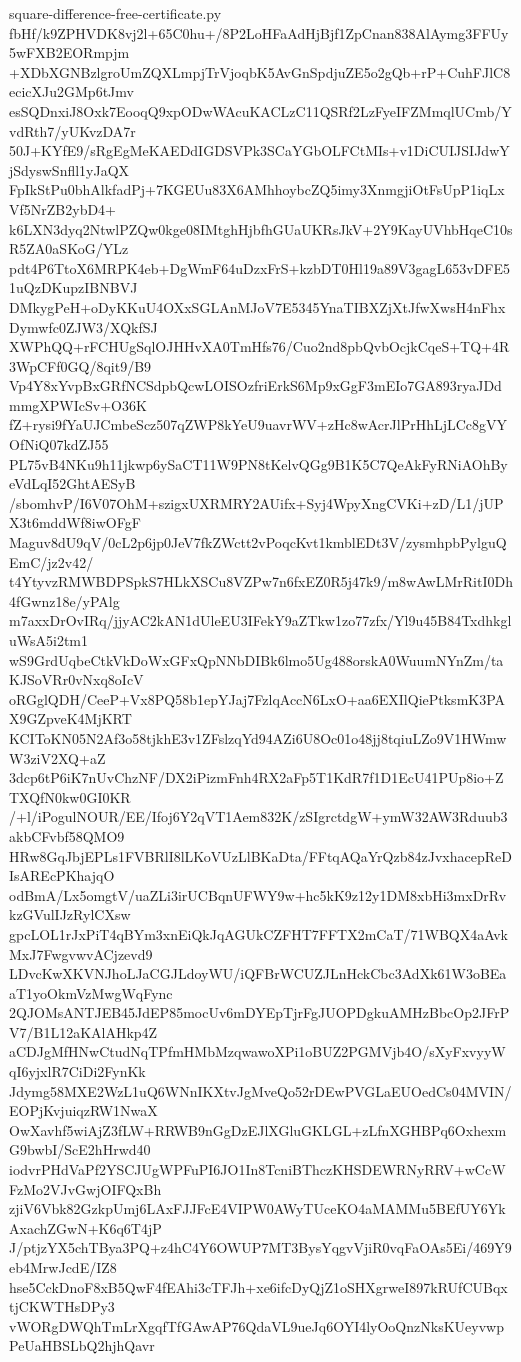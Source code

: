 \documentclass[11pt]{article}
\theoremstyle{definition}
\theoremstyle{remark}
\begin{document}
\begin{filecontents*}[overwrite]{square-difference-free-certificate.py}
fbHf/k9ZPHVDK8vj2l+65C0hu+/8P2LoHFaAdHjBjf1ZpCnan838AlAymg3FFUy5wFXB2EORmpjm
+XDbXGNBzlgroUmZQXLmpjTrVjoqbK5AvGnSpdjuZE5o2gQb+rP+CuhFJlC8ecicXJu2GMp6tJmv
esSQDnxiJ8Oxk7EooqQ9xpODwWAcuKACLzC11QSRf2LzFyeIFZMmqlUCmb/YvdRth7/yUKvzDA7r
50J+KYfE9/sRgEgMeKAEDdIGDSVPk3SCaYGbOLFCtMIs+v1DiCUIJSIJdwYjSdyswSnfll1yJaQX
FpIkStPu0bhAlkfadPj+7KGEUu83X6AMhhoybcZQ5imy3XnmgjiOtFsUpP1iqLxVf5NrZB2ybD4+
k6LXN3dyq2NtwlPZQw0kge08IMtghHjbfhGUaUKRsJkV+2Y9KayUVhbHqeC10sR5ZA0aSKoG/YLz
pdt4P6TtoX6MRPK4eb+DgWmF64uDzxFrS+kzbDT0Hl19a89V3gagL653vDFE51uQzDKupzIBNBVJ
DMkygPeH+oDyKKuU4OXxSGLAnMJoV7E5345YnaTIBXZjXtJfwXwsH4nFhxDymwfc0ZJW3/XQkfSJ
XWPhQQ+rFCHUgSqlOJHHvXA0TmHfs76/Cuo2nd8pbQvbOcjkCqeS+TQ+4R3WpCFf0GQ/8qit9/B9
Vp4Y8xYvpBxGRfNCSdpbQcwLOISOzfriErkS6Mp9xGgF3mEIo7GA893ryaJDdmmgXPWIcSv+O36K
fZ+rysi9fYaUJCmbeScz507qZWP8kYeU9uavrWV+zHc8wAcrJlPrHhLjLCc8gVYOfNiQ07kdZJ55
PL75vB4NKu9h11jkwp6ySaCT11W9PN8tKelvQGg9B1K5C7QeAkFyRNiAOhByeVdLqI52GhtAESyB
/sbomhvP/I6V07OhM+szigxUXRMRY2AUifx+Syj4WpyXngCVKi+zD/L1/jUPX3t6mddWf8iwOFgF
Maguv8dU9qV/0cL2p6jp0JeV7fkZWctt2vPoqcKvt1kmblEDt3V/zysmhpbPylguQEmC/jz2v42/
t4YtyvzRMWBDPSpkS7HLkXSCu8VZPw7n6fxEZ0R5j47k9/m8wAwLMrRitI0Dh4fGwnz18e/yPAlg
m7axxDrOvIRq/jjyAC2kAN1dUleEU3IFekY9aZTkw1zo77zfx/Yl9u45B84TxdhkgluWsA5i2tm1
wS9GrdUqbeCtkVkDoWxGFxQpNNbDIBk6lmo5Ug488orskA0WuumNYnZm/taKJSoVRr0vNxq8oIcV
oRGglQDH/CeeP+Vx8PQ58b1epYJaj7FzlqAccN6LxO+aa6EXIlQiePtksmK3PAX9GZpveK4MjKRT
KCIToKN05N2Af3o58tjkhE3v1ZFslzqYd94AZi6U8Oc01o48jj8tqiuLZo9V1HWmwW3ziV2XQ+aZ
3dcp6tP6iK7nUvChzNF/DX2iPizmFnh4RX2aFp5T1KdR7f1D1EcU41PUp8io+ZTXQfN0kw0GI0KR
/+l/iPogulNOUR/EE/Ifoj6Y2qVT1Aem832K/zSIgrctdgW+ymW32AW3Rduub3akbCFvbf58QMO9
HRw8GqJbjEPLs1FVBRlI8lLKoVUzLlBKaDta/FFtqAQaYrQzb84zJvxhacepReDIsAREcPKhajqO
odBmA/Lx5omgtV/uaZLi3irUCBqnUFWY9w+hc5kK9z12y1DM8xbHi3mxDrRvkzGVulIJzRylCXsw
gpcLOL1rJxPiT4qBYm3xnEiQkJqAGUkCZFHT7FFTX2mCaT/71WBQX4aAvkMxJ7FwgvwvACjzevd9
LDvcKwXKVNJhoLJaCGJLdoyWU/iQFBrWCUZJLnHckCbc3AdXk61W3oBEaaT1yoOkmVzMwgWqFync
2QJOMsANTJEB45JdEP85mocUv6mDYEpTjrFgJUOPDgkuAMHzBbcOp2JFrPV7/B1L12aKAlAHkp4Z
aCDJgMfHNwCtudNqTPfmHMbMzqwawoXPi1oBUZ2PGMVjb4O/sXyFxvyyWqI6yjxlR7CiDi2FynKk
Jdymg58MXE2WzL1uQ6WNnIKXtvJgMveQo52rDEwPVGLaEUOedCs04MVIN/EOPjKvjuiqzRW1NwaX
OwXavhf5wiAjZ3fLW+RRWB9nGgDzEJlXGluGKLGL+zLfnXGHBPq6OxhexmG9bwbI/ScE2hHrwd40
iodvrPHdVaPf2YSCJUgWPFuPI6JO1In8TcniBThczKHSDEWRNyRRV+wCcWFzMo2VJvGwjOIFQxBh
zjiV6Vbk82GzkpUmj6LAxFJJFcE4VIPW0AWyTUceKO4aMAMMu5BEfUY6YkAxachZGwN+K6q6T4jP
J/ptjzYX5chTBya3PQ+z4hC4Y6OWUP7MT3BysYqgvVjiR0vqFaOAs5Ei/469Y9eb4MrwJcdE/IZ8
hse5CckDnoF8xB5QwF4fEAhi3cTFJh+xe6ifcDyQjZ1oSHXgrweI897kRUfCUBqxtjCKWTHsDPy3
vWORgDWQhTmLrXgqfTfGAwAP76QdaVL9ueJq6OYI4lyOoQnzNksKUeyvwpPeUaHBSLbQ2hjhQavr

\end{filecontents*}
\end{document}
